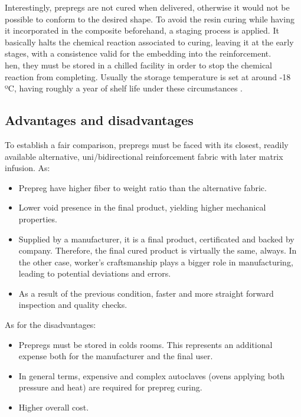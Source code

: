 Interestingly, prepregs are not cured when delivered, otherwise it would not be
possible to conform to the desired shape. To avoid the resin curing while having
it incorporated in the composite beforehand, a staging process is applied. It
basically halts the chemical reaction associated to curing, leaving it at the early
stages, with a consistence valid for the embedding into the reinforcement.\\

hen, they must be stored in a chilled facility in order to stop the chemical
reaction from completing. Usually the storage temperature is set at around -18 ºC,
having roughly a year of shelf life under these circumstances \cite{https://www.sciencedirect.com/science/article/pii/S2212827117311800}.\\

\subsection{Advantages and disadvantages}

To establish a fair comparison, prepregs must be faced with its closest, readily
available alternative, uni/bidirectional reinforcement fabric with later matrix
infusion. As:\\

\begin{itemize}
	\item Prepreg have higher fiber to weight ratio than the alternative fabric.
	\item Lower void presence in the final product, yielding higher mechanical properties.
	\item Supplied by a manufacturer, it is a final product, certificated and
	backed by company. Therefore, the final cured product is virtually the same,
	always. In the other case, worker’s craftsmanship plays a bigger role in
	manufacturing, leading to potential deviations and errors.
	\item As a result of the previous condition, faster and more straight
	forward inspection and quality checks.
\end{itemize}

As for the disadvantages:

\begin{itemize}
	\item Prepregs must be stored in colds rooms. This represents an additional
	expense both for the manufacturer and the final user.
	\item In general terms, expensive and complex autoclaves (ovens applying
	both pressure and heat) are required for prepreg curing.
	\item Higher overall cost.
\end{itemize}

